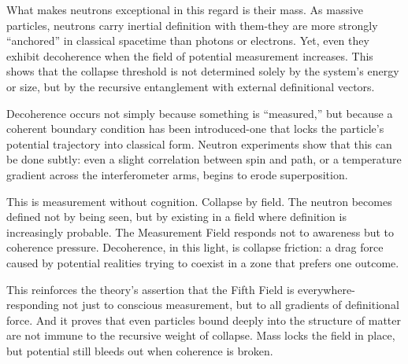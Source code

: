 What makes neutrons exceptional in this regard is their mass. As massive particles, neutrons carry inertial definition with them-they are more strongly “anchored” in classical spacetime than photons or electrons. Yet, even they exhibit decoherence when the field of potential measurement increases. This shows that the collapse threshold is not determined solely by the system’s energy or size, but by the recursive entanglement with external definitional vectors.

Decoherence occurs not simply because something is “measured,” but because a coherent boundary condition has been introduced-one that locks the particle’s potential trajectory into classical form. Neutron experiments show that this can be done subtly: even a slight correlation between spin and path, or a temperature gradient across the interferometer arms, begins to erode superposition.

This is measurement without cognition. Collapse by field. The neutron becomes defined not by being seen, but by existing in a field where definition is increasingly probable. The Measurement Field responds not to awareness but to coherence pressure. Decoherence, in this light, is collapse friction: a drag force caused by potential realities trying to coexist in a zone that prefers one outcome.

This reinforces the theory’s assertion that the Fifth Field is everywhere-responding not just to conscious measurement, but to all gradients of definitional force. And it proves that even particles bound deeply into the structure of matter are not immune to the recursive weight of collapse. Mass locks the field in place, but potential still bleeds out when coherence is broken.


\nocite{*}
\printbibliography[title={Appendix C References}, keyword=chapter3]
